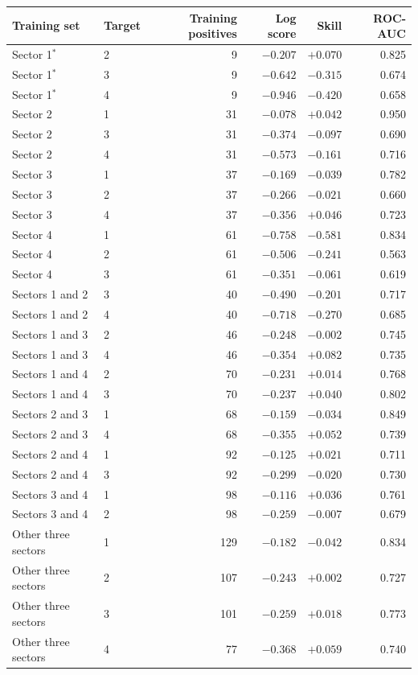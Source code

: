 \begin{tabular}{llrrrr}
\toprule
Training set & Target & Training positives & Log score & Skill & ROC-AUC \\
\midrule
Sector 1$^{*}$ & 2 & 9 & $-0.207$ & $+0.070$ & 0.825 \\
Sector 1$^{*}$ & 3 & 9 & $-0.642$ & $-0.315$ & 0.674 \\
Sector 1$^{*}$ & 4 & 9 & $-0.946$ & $-0.420$ & 0.658 \\
Sector 2 & 1 & 31 & $-0.078$ & $+0.042$ & 0.950 \\
Sector 2 & 3 & 31 & $-0.374$ & $-0.097$ & 0.690 \\
Sector 2 & 4 & 31 & $-0.573$ & $-0.161$ & 0.716 \\
Sector 3 & 1 & 37 & $-0.169$ & $-0.039$ & 0.782 \\
Sector 3 & 2 & 37 & $-0.266$ & $-0.021$ & 0.660 \\
Sector 3 & 4 & 37 & $-0.356$ & $+0.046$ & 0.723 \\
Sector 4 & 1 & 61 & $-0.758$ & $-0.581$ & 0.834 \\
Sector 4 & 2 & 61 & $-0.506$ & $-0.241$ & 0.563 \\
Sector 4 & 3 & 61 & $-0.351$ & $-0.061$ & 0.619 \\
\midrule
Sectors 1 and 2 & 3 & 40 & $-0.490$ & $-0.201$ & 0.717 \\
Sectors 1 and 2 & 4 & 40 & $-0.718$ & $-0.270$ & 0.685 \\
Sectors 1 and 3 & 2 & 46 & $-0.248$ & $-0.002$ & 0.745 \\
Sectors 1 and 3 & 4 & 46 & $-0.354$ & $+0.082$ & 0.735 \\
Sectors 1 and 4 & 2 & 70 & $-0.231$ & $+0.014$ & 0.768 \\
Sectors 1 and 4 & 3 & 70 & $-0.237$ & $+0.040$ & 0.802 \\
Sectors 2 and 3 & 1 & 68 & $-0.159$ & $-0.034$ & 0.849 \\
Sectors 2 and 3 & 4 & 68 & $-0.355$ & $+0.052$ & 0.739 \\
Sectors 2 and 4 & 1 & 92 & $-0.125$ & $+0.021$ & 0.711 \\
Sectors 2 and 4 & 3 & 92 & $-0.299$ & $-0.020$ & 0.730 \\
Sectors 3 and 4 & 1 & 98 & $-0.116$ & $+0.036$ & 0.761 \\
Sectors 3 and 4 & 2 & 98 & $-0.259$ & $-0.007$ & 0.679 \\
\midrule
Other three sectors & 1 & 129 & $-0.182$ & $-0.042$ & 0.834 \\
Other three sectors & 2 & 107 & $-0.243$ & $+0.002$ & 0.727 \\
Other three sectors & 3 & 101 & $-0.259$ & $+0.018$ & 0.773 \\
Other three sectors & 4 & 77 & $-0.368$ & $+0.059$ & 0.740 \\
\bottomrule
\end{tabular}
